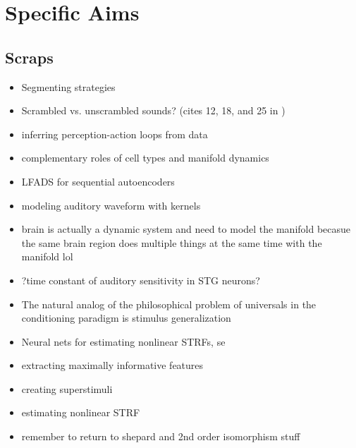 
% 

\section{Specific Aims}

\begin{multicols}{2}

\subsection{Scraps}


\begin{itemize}
\item Segmenting strategies \cite{ashwoodMiceAlternateDiscrete2020}
\item Scrambled vs. unscrambled sounds? (cites 12, 18, and 25 in \cite{norman-haignereHierarchicalIntegrationMultiple2020})
\item inferring perception-action loops from data \cite{rosasCausalBlanketsTheory2020}
\item complementary roles of cell types and manifold dynamics \cite{dubreuilComplementaryRolesDimensionality2020}
\item LFADS for sequential autoencoders \cite{pandarinathInferringSingletrialNeural2018}
\item modeling auditory waveform with kernels \cite{smithEfficientAuditoryCoding2006a}
\item brain is actually a dynamic system and need to model the manifold \cite{brembsBrainDynamicallyActive2020} becasue the same brain region does multiple things at the same time with the manifold lol \cite{gallegoCorticalPopulationActivity2018}
\item ?time constant of auditory sensitivity in STG neurons?
\item The natural analog of the philosophical problem of universals in the conditioning paradigm is stimulus generalization \cite{roschWittgensteinCategorizationResearch1987}	
\item Neural nets for estimating nonlinear STRFs, se \cite{kingRecentAdvancesUnderstanding2018a}
\item extracting maximally informative features \cite{liuOptimalFeaturesAuditory2019}
\item creating superstimuli \cite{decharmsOptimizingSoundFeatures1998}
\item estimating nonlinear STRF\cite{ahrensNonlinearitiesContextualInfluences2008}
\item remember to return to shepard and 2nd order isomorphism stuff


\end{itemize}
\end{multicols}
